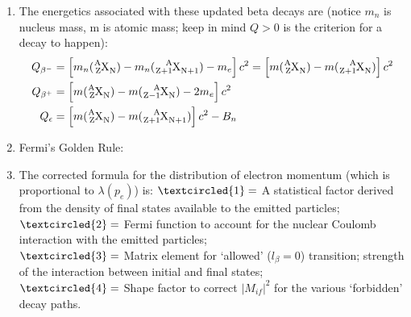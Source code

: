 \documentclass{school-22.101-notes}
\begin{document}
\begin{enumerate}
\begin{enumerate}
    \end{enumerate}
\item The energetics associated with these updated beta decays are (notice $m_n$ is nucleus mass, m is atomic mass; keep in mind $Q>0$ is the criterion for a decay to happen):
\begin{align}
Q_{\beta^-} &= \left[ m_n (\ce{^A_Z X_N}) - m_n (\ce{^A_{Z+1} X_{N+1}}) - m_e \right] c^2 = \left[ m (\ce{^A_Z X_N}) - m (\ce{^A_{Z+1} X_{N}}) \right] c^2 \\
Q_{\beta^+} &= \left[ m (\ce{^A_Z X_N}) - m (\ce{^A_{Z-1} X_{N}}) - 2m_e \right] c^2 \\
Q_{\epsilon} &= \left[ m (\ce{^A_Z X_N}) - m (\ce{^A_{Z+1} X_{N+1}}) \right] c^2 - B_n 
\end{align}
\item Fermi's Golden Rule:
\item The corrected formula for the distribution of electron momentum (which is proportional to $\lambda(p_e)$) is:
$\textcircled{1}=$ A statistical factor derived from the density of final states available to the emitted particles; \\
$\textcircled{2}=$ Fermi function to account for the nuclear Coulomb interaction with the emitted particles;\\
$\textcircled{3}=$ Matrix element for `allowed' ($l_{\beta} = 0$) transition; strength of the interaction between initial and final states; \\
$\textcircled{4}=$ Shape factor to correct $|M_{if}|^2$ for the various `forbidden' decay paths.    
\end{enumerate}
\end{document}
